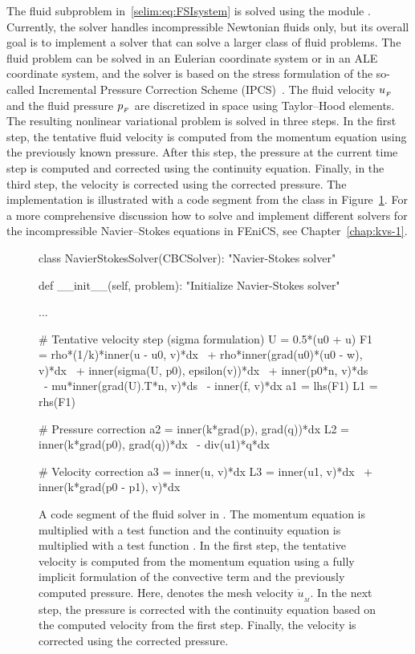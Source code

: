 The fluid subproblem in~\eqref{selim:eq:FSIsystem} is solved using the
 module . Currently, the solver
handles incompressible Newtonian fluids only, but its overall goal is
to implement a solver that can solve a larger class of fluid problems.
The fluid problem can be solved in an Eulerian coordinate system or in
an ALE coordinate system, and the solver is based on the stress
formulation of the so-called Incremental Pressure Correction Scheme
(IPCS)~\cite{Goda1979}. The fluid velocity $u_{_{F}}$ and the fluid
pressure $p_{_{F}}$ are discretized in space using Taylor--Hood
elements. The resulting nonlinear variational problem is solved in
three steps. In the first step, the tentative fluid velocity is
computed from the momentum equation using the previously known
pressure. After this step, the pressure at the current time step is
computed and corrected using the continuity equation. Finally, in the
third step, the velocity is corrected using the corrected pressure.
The implementation is illustrated with a code segment from the class
 in Figure~\ref{selim:fig:fluidsolver}. For
a more comprehensive discussion how to solve and implement different
solvers for the incompressible Navier--Stokes equations in FEniCS, see
Chapter~\ref{chap:kvs-1}.
\begin{figure}
\begin{center}
\begin{python}
 class NavierStokesSolver(CBCSolver):
    "Navier-Stokes solver"

   def __init__(self, problem):
        "Initialize Navier-Stokes solver"

        ...

        # Tentative velocity step (sigma formulation)
        U = 0.5*(u0 + u)
        F1 = rho*(1/k)*inner(u - u0, v)*dx \
           + rho*inner(grad(u0)*(u0 - w), v)*dx \
           + inner(sigma(U, p0), epsilon(v))*dx \
           + inner(p0*n, v)*ds \
           - mu*inner(grad(U).T*n, v)*ds \
           - inner(f, v)*dx
        a1 = lhs(F1)
        L1 = rhs(F1)

        # Pressure correction
        a2 = inner(k*grad(p), grad(q))*dx
        L2 = inner(k*grad(p0), grad(q))*dx \
           - div(u1)*q*dx

        # Velocity correction
        a3 = inner(u, v)*dx
        L3 = inner(u1, v)*dx \
           + inner(k*grad(p0 - p1), v)*dx
\end{python}
\caption{A code segment of the fluid solver in . The
  momentum equation is multiplied with a test function  and
  the continuity equation is multiplied with a test function
  \emp{q}. In the first step, the tentative velocity is computed
  from the momentum equation using a fully implicit formulation of the
  convective term and the previously computed pressure. Here, 
  denotes the mesh velocity $\dot{u}_{_{M}}$. In the next step, the
  pressure is corrected with the continuity equation based on the
  computed velocity \emp{u1} from the first step. Finally, the
  velocity is corrected using the corrected pressure.}
\label{selim:fig:fluidsolver}
\end{center}
\end{figure}

